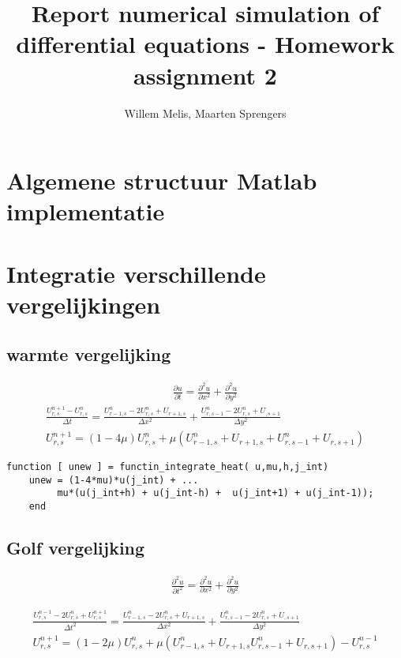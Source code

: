 \documentclass[11pt]{article} %
\title{Report numerical simulation of differential equations - Homework assignment 2}
\author{Willem Melis, Maarten Sprengers}
\begin{document}
\maketitle
\newpage
\tableofcontents
\newpage

\section{Algemene structuur Matlab implementatie}
\section{Integratie verschillende vergelijkingen}

	\subsection{warmte vergelijking}
		\begin{eqnarray}
			\frac{\partial u}{\partial t} = 
			\frac{\partial ^2 u}{\partial x^2} + 
			\frac{\partial ^2 u}{\partial  y^2} 	
		\end{eqnarray}
		\begin{eqnarray}
			\frac{U_{r,s}^{n+1} - U_{r,s}^n}{\Delta t} =
			\frac{U_{r-1,s}^n - 2 U_{r,s}^n + U_{r+1,s}}{\Delta x^2} + 
			\frac{U_{r,s-1}^n - 2 U_{r,s}^n + U_{,s+1} }{\Delta y^2} \\
			U_{r,s}^{n+1} =( 1-4\mu )U_{r,s}^n + \mu (U_{r-1,s}^n  + U_{r+1,s} + 
			U_{r,s-1}^n  + U_{r,s+1})
		\end{eqnarray}

\begin{lstlisting}[caption=Code Explicit Euler,label={lst:expl_euler}]
function [ unew ] = functin_integrate_heat( u,mu,h,j_int)
	unew = (1-4*mu)*u(j_int) + ... 
	     mu*(u(j_int+h) + u(j_int-h) +  u(j_int+1) + u(j_int-1));
	end
\end{lstlisting}
	\subsection{Golf vergelijking}
		\begin{eqnarray}
		\frac{\partial^2 u}{\partial t^2} = 
		\frac{\partial ^2 u}{\partial x^2} + 
		\frac{\partial ^2 u}{\partial  y^2} 	
		\end{eqnarray}

		\begin{eqnarray}
			\frac{U_{r,s}^{n-1} - 2U_{r,s}^{n}+U_{r,s}^{n+1} }{\Delta t^2} 
			=
			\frac{U_{r-1,s}^n - 2 U_{r,s}^n + U_{r+1,s}}{\Delta x^2} + 
			\frac{U_{r,s-1}^n - 2 U_{r,s}^n + U_{,s+1} }{\Delta y^2} \\
			U_{r,s}^{n+1} = ( 1-2\mu )U_{r,s}^n + \mu (U_{r-1,s}^n  + U_{r+1,s}
			U_{r,s-1}^n  + U_{r,s+1}) - U_{r,s}^{n-1}
		\end{eqnarray}
\end{document}
